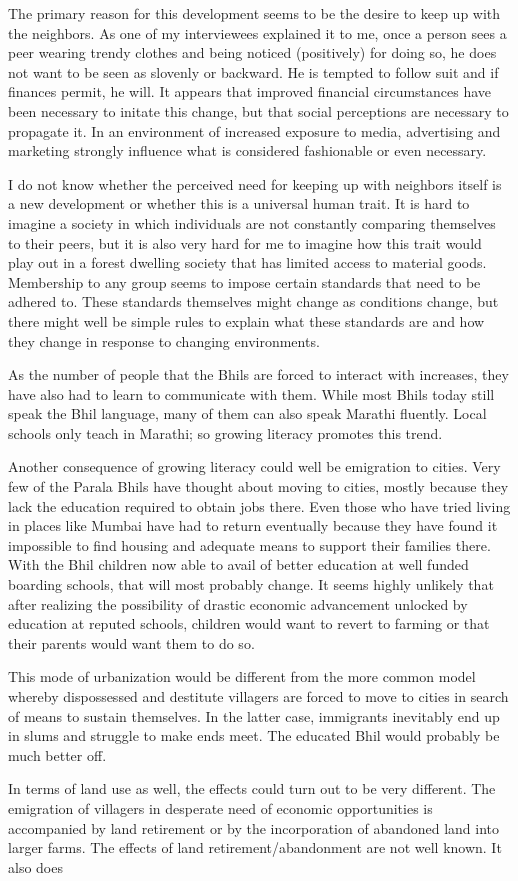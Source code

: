 \documentclass[report.tex]{subfiles}
\begin{document}
The primary reason for this development seems to be the desire to keep up with the neighbors. As one of my interviewees explained it to me, once a person sees a peer wearing trendy clothes and being noticed (positively) for doing so, he does not want to be seen as slovenly or backward. He is tempted to follow suit and if finances permit, he will. It appears that improved financial circumstances have been necessary to initate this change, but that social perceptions are necessary to propagate it. In an environment of increased exposure to media, advertising and marketing strongly influence what is considered fashionable or even necessary.

I do not know whether the perceived need for keeping up with neighbors itself is a new development or whether this is a universal human trait. It is hard to imagine a society in which individuals are not constantly comparing themselves to their peers, but it is also very hard for me to imagine how this trait would play out in a forest dwelling society that has limited access to material goods. Membership to any group seems to impose certain standards that need to be adhered to. These standards themselves might change as conditions change, but there might well be simple rules to explain what these standards are and how they change in response to changing environments.

As the number of people that the Bhils are forced to interact with increases, they have also had to learn to communicate with them. While most Bhils today still speak the Bhil language, many of them can also speak Marathi fluently. Local schools only teach in Marathi; so growing literacy promotes this trend.

Another consequence of growing literacy could well be emigration to cities. Very few of the Parala Bhils have thought about moving to cities, mostly because they lack the education required to obtain jobs there. Even those who have tried living in places like Mumbai have had to return eventually because they have found it impossible to find housing and adequate means to support their families there. With the Bhil children now able to avail of better education at well funded boarding schools, that will most probably change. It seems highly unlikely that after realizing the possibility of drastic economic advancement unlocked by education at reputed schools, children would want to revert to farming or that their parents would want them to do so.

This mode of urbanization would be different from the more common model whereby dispossessed and destitute villagers are forced to move to cities in search of means to sustain themselves. In the latter case, immigrants inevitably end up in slums and struggle to make ends meet. The educated Bhil would probably be much better off.

In terms of land use as well, the effects could turn out to be very different. The emigration of villagers in desperate need of economic opportunities is accompanied by land retirement or by the incorporation of abandoned land into larger farms. The effects of land retirement/abandonment are not well known. It also does 
\end{document}
